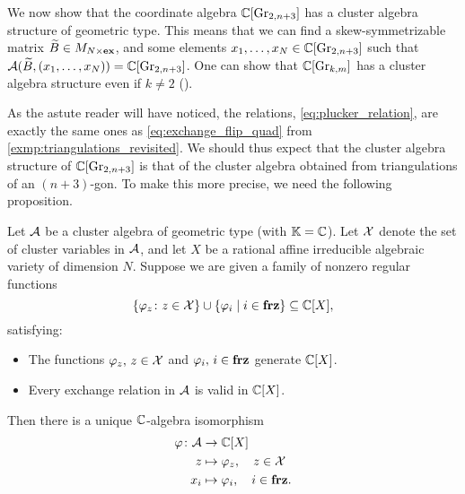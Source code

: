\medskip

We now show that the coordinate algebra $\mathbb{C}[\operatorname{Gr}_{2,n+3}]$ has a cluster algebra
structure of geometric type. This means that we can find a skew-symmetrizable matrix
$\widetilde{B} \in M_{N \times \mathbf{ex}}$, and some elements $x_1, \dots, x_N \in \mathbb{C}[\operatorname{Gr}_{2, n+3}]$
such that $\mathcal{A}(\widetilde{B}, (x_1, \dots, x_N)) = \mathbb{C}[\operatorname{Gr}_{2, n+3}]$. One can show that
$\mathbb{C}[\operatorname{Gr}_{k,m}]$ has a cluster algebra structure even if $k \neq 2$
(\cite{Scott2006GrassmanniansCA}).

As the astute reader will have noticed, the relations, \cref{eq:plucker_relation}, are
exactly the same ones as \cref{eq:exchange_flip_quad} from
\cref{exmp:triangulations_revisited}. We should thus expect that the cluster algebra
structure of $\mathbb{C}[\operatorname{Gr}_{2,n+3}]$ is that of the cluster algebra obtained from
triangulations of an $(n+3)$-gon. To make this more precise, we need the following
proposition.
\begin{proposition}

	Let $\mathcal{A}$ be a cluster algebra of geometric type (with $\mathbb{K} = \mathbb{C}$). Let $\mathcal{X}$
	denote the set of cluster variables in $\mathcal{A}$, and let $X$ be a rational affine
	irreducible algebraic variety of dimension $N$. Suppose we are given a family of
	nonzero regular functions
	\begin{equation*}
		\{\varphi_z \colon z \in \mathcal{X} \} \cup \{\varphi_i \mid i \in \mathbf{frz}\} \subseteq \mathbb{C}[X],
	\end{equation*}
	satisfying:
	\begin{itemize}
		\item The functions $\varphi_z,\, z\in \mathcal{X}$ and $\varphi_i,\, i \in \mathbf{frz}$ generate
		      $\mathbb{C}[X]$.
		\item Every exchange relation in $\mathcal{A}$ is valid in $\mathbb{C}[X]$.
	\end{itemize}
	Then there is a unique $\mathbb{C}$-algebra isomorphism
	\begin{align*}
		\varphi \colon \mathcal{A} & \to \mathbb{C}[X]                         \\
		z                   & \mapsto \varphi_z,\quad z \in \mathcal{X}  \\
		x_i                 & \mapsto \varphi_i,\quad i \in \mathbf{frz}.
	\end{align*}
\end{proposition}

